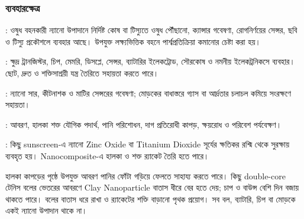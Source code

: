 \subsubsection{ব্যবহারক্ষেত্র}
\begin{compactpoints}
\item {}: ওষুধ বহনকারী ন্যানো উপাদানে নির্দিষ্ট কোষ বা টিস্যুতে ওষুধ পৌঁছানো, ক্যান্সার গবেষণা, রোগনির্ণয়ের সেন্সর, ছবি ও টিস্যু প্রকৌশলে ব্যবহার আছে। উপযুক্ত লক্ষ্যভিত্তিক বহনে পার্শ্বপ্রতিক্রিয়া কমানোর চেষ্টা করা হয়।
\item {}: ক্ষুদ্র ট্রানজিস্টর, চিপ, মেমরি, ডিসপ্লে, সেন্সর, ব্যাটারির ইলেকট্রোড, সৌরকোষ ও নমনীয় ইলেকট্রনিকসে ব্যবহার। ছোট, দ্রুত ও শক্তিসাশ্রয়ী যন্ত্র তৈরিতে সহায়তা করতে পারে।
\item {}: ন্যানো সার, কীটনাশক ও মাটির সেন্সরের গবেষণা; মোড়কের বাধাস্তরে গ্যাস বা আর্দ্রতার চলাচল কমিয়ে সংরক্ষণে সহায়তা।
\item {}: আবরণ, হালকা শক্ত যৌগিক পদার্থ, পানি পরিশোধন, দাগ প্রতিরোধী কাপড়, ক্ষয়রোধ ও পরিবেশ পর্যবেক্ষণ।
\item {}: কিছু sunscreen-এ ন্যানো Zinc Oxide বা Titanium Dioxide সূর্যের ক্ষতিকর রশ্মি থেকে সুরক্ষায় ব্যবহৃত হয়। Nanocomposite-এ হালকা ও শক্ত র‍্যাকেট তৈরি হতে পারে।
\end{compactpoints}
হালকা কাপড়ের পৃষ্ঠে উপযুক্ত আবরণ পানির ফোঁটা গড়িয়ে ফেলতে সাহায্য করতে পারে। কিছু double-core টেনিস বলের ভেতরের আবরণে Clay Nanoparticle বাতাস ধীরে বের হতে দেয়; চাপ ও বাউন্স বেশি দিন বজায় থাকতে পারে। বলের বাতাস ধরে রাখা ও র‍্যাকেটের শক্তি বাড়ানো পৃথক প্রয়োগ। সব বল, ব্যাটারি, চিপ বা মোড়কে একই ন্যানো উপাদান থাকে না।
